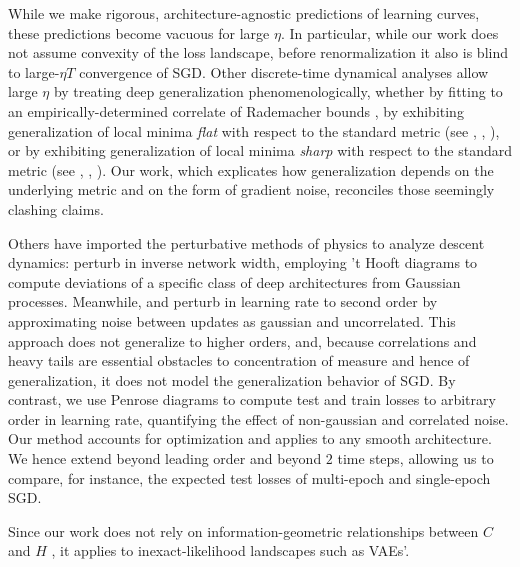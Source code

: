 \documentclass{article}
\begin{document}
    While we make rigorous, architecture-agnostic predictions of learning
    curves, these predictions become vacuous for large $\eta$.  In particular,
    while our work does not assume convexity of the loss landscape, before
    renormalization it also is blind to large-$\eta T$ convergence of SGD.
    Other discrete-time dynamical analyses allow large $\eta$ by treating deep
    generalization phenomenologically, whether by fitting to an
    empirically-determined correlate of Rademacher bounds \citep{li18}, by
    exhibiting generalization of local minima \emph{flat} with respect to the
    standard metric (see \citet{ho17}, \citet{ke17}, \citet{wa18}), or by
    exhibiting generalization of local minima \emph{sharp} with respect to the
    standard metric (see \citet{st56}, \citet{di17}, \citet{wu18}).  Our work,
    which explicates how generalization depends on the underlying
    metric and on the form of gradient noise, reconciles those
    seemingly clashing claims.
    

    Others have imported the perturbative methods of physics to analyze descent
    dynamics:  \citet{dy19} perturb in inverse network width, employing 't
    Hooft diagrams to compute deviations of a specific class of deep
    architectures from Gaussian processes.  Meanwhile, \cite{ch18} and
    \citet{li17} perturb in learning rate to second order by approximating
    noise between updates as gaussian and uncorrelated.  This approach does not
    generalize to higher orders, and, because correlations and heavy tails are
    essential obstacles to concentration of measure and hence of
    generalization, it does not model the generalization behavior of SGD.  By
    contrast, we use Penrose diagrams to compute test and train losses to
    arbitrary order in learning rate, quantifying the effect of non-gaussian
    and correlated noise.  Our method accounts for optimization and applies to
    any smooth architecture.  We hence extend \citet{ro18} beyond leading order
    and beyond $2$ time steps, allowing us to compare, for instance, the
    expected test losses of multi-epoch and single-epoch SGD.

    Since our work does not rely on information-geometric
    relationships between $C$ and $H$ \citep{am98}, it applies to
    inexact-likelihood landscapes such as VAEs'. 
\end{document}
